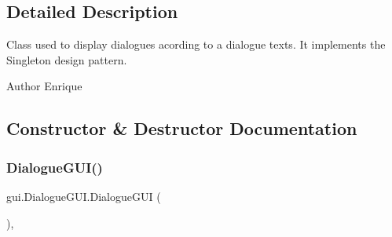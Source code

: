 \subsection{Detailed Description}
Class used to display dialogues acording to a dialogue texts. It implements the Singleton design pattern.

\begin{DoxyAuthor}{Author}
Enrique 
\end{DoxyAuthor}


\subsection{Constructor \& Destructor Documentation}
\mbox{\label{classgui_1_1_dialogue_g_u_i_a576d9a1c4f0132c3910dfd5206a4a094}} 
\subsubsection{\texorpdfstring{Dialogue\+G\+U\+I()}{DialogueGUI()}}
{\footnotesize\ttfamily gui.\+Dialogue\+G\+U\+I.\+Dialogue\+G\+UI (\begin{DoxyParamCaption}{ }\end{DoxyParamCaption})\hspace{0.3cm}{\ttfamily [inline]}, {\ttfamily [private]}}



